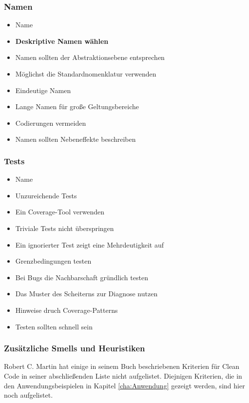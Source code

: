 \subsubsection{Namen}

\begin{itemize}
			\item Name
			\item \textbf{Deskriptive Namen wählen}
			\item Namen sollten der Abstraktionsebene entsprechen 
			\item Möglichst die Standardnomenklatur verwenden 
			\item Eindeutige Namen 
			\item Lange Namen für große Geltungsbereiche 
			\item Codierungen vermeiden 
			\item Namen sollten Nebeneffekte beschreiben
\end{itemize}

\subsubsection{Tests}

\begin{itemize}
	\item Name 
	\item Unzureichende Tests 
	\item Ein Coverage-Tool verwenden 
	\item Triviale Tests nicht überspringen 
	\item Ein ignorierter Test zeigt eine Mehrdeutigkeit auf 
	\item Grenzbedingungen testen 
	\item Bei Bugs die Nachbarschaft gründlich testen 
	\item Das Muster des Scheiterns zur Diagnose nutzen 
	\item Hinweise druch Coverage-Patterns 
	\item Testen sollten schnell sein 
\end{itemize}

\subsubsection{Zusätzliche Smells und Heuristiken}
Robert C. Martin hat einige in seinem Buch beschriebenen Kriterien für Clean Code in seiner abschließenden Liste nicht aufgelistet. Diejnigen Kriterien, die in den Anwendungsbeispielen in Kapitel \ref{cha:Anwendung} gezeigt werden, sind hier noch aufgelistet.

